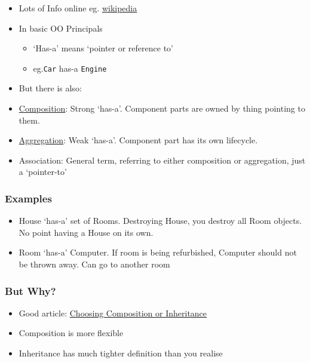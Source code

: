 \begin{itemize}
\itemsep1pt\parskip0pt
\item
  Lots of Info online eg.
  \href{https://en.wikipedia.org/wiki/Composition_over_inheritance}{wikipedia}
\item
  In basic OO Principals

  \begin{itemize}
  \itemsep1pt\parskip0pt
  \item
    `Has-a' means `pointer or reference to'
  \item
    eg.\texttt{Car} has-a \texttt{Engine}
  \end{itemize}
\item
  But there is also:
\item
  \href{https://en.wikipedia.org/wiki/Object_composition\#Composition}{Composition}:
  Strong `has-a'. Component parts are owned by thing pointing to them.
\item
  \href{https://en.wikipedia.org/wiki/Object_composition\#Aggregation}{Aggregation}:
  Weak `has-a'. Component part has its own lifecycle.
\item
  Association: General term, referring to either composition or
  aggregation, just a `pointer-to'
\end{itemize}

\subsubsection{Examples}\label{examples}

\begin{itemize}
\itemsep1pt\parskip0pt
\item
  House `has-a' set of Rooms. Destroying House, you destroy all Room
  objects. No point having a House on its own.
\item
  Room `has-a' Computer. If room is being refurbished, Computer should
  not be thrown away. Can go to another room
\end{itemize}

\subsubsection{But Why?}\label{but-why}

\begin{itemize}
\itemsep1pt\parskip0pt
\item
  Good article:
  \href{https://www.thoughtworks.com/insights/blog/composition-vs-inheritance-how-choose}{Choosing
  Composition or Inheritance}
\item
  Composition is more flexible
\item
  Inheritance has much tighter definition than you realise
\end{itemize}

